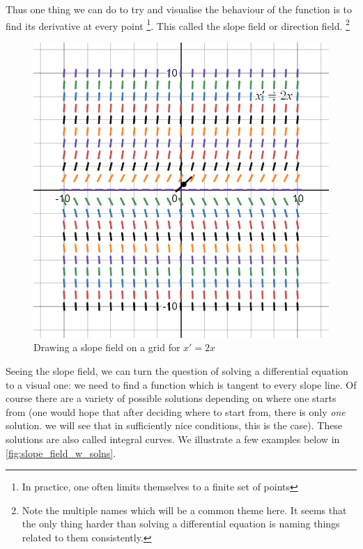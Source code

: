 Thus one thing we can do to try and visualise the behaviour of the function is to find its derivative at every point \footnote{In practice, one often limits themselves to a finite set of points}. This called the slope field or direction field. \footnote{Note the multiple names which will be a common theme here. It seems that the only thing harder than solving a differential equation is naming things related to them consistently.}
\begin{figure}[ht]
    \centering
    \includegraphics[scale=0.3]{Images/slope_field_2.png}
    \caption{Drawing a slope field on a grid for $x' = 2x$}
    \label{fig:slope_field}
\end{figure}

Seeing the slope field, we can turn the question of solving a differential equation to a visual one: we need to find a function which is tangent to every slope line. Of course there are a variety of possible solutions depending on where one starts from (one would hope that after deciding where to start from, there is only \textit{one} solution. we will see that in sufficiently nice conditions, this is the case). These solutions are also called integral curves. We illustrate a few examples below in \autoref{fig:slope_field_w_solns}. 

